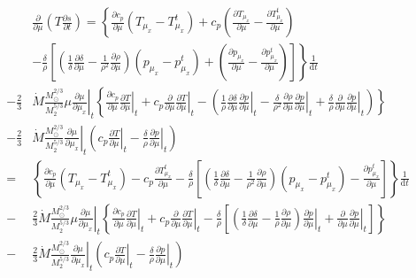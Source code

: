 \documentclass[12pt,a4paper]{article}
\newcommand{\pfird}[2][]{\frac{\partial#1}{\partial#2}}
\newcommand{\dd}[1]{\mathrm{d}#1}
\begin{document}
\begin{itemize}
  \begin{align}
    &\pfird[]{\mu}\left(T\pfird[s]{t}\right) = \left\{\pfird[c_p]{\mu}\left(T_{\mu_x} - T_{\mu_x}^t\right) + c_p\left(\pfird[T_{\mu_x}]{\mu} - \pfird[T_{\mu_x}^t]{\mu}\right)\right.\nonumber\\
    &\left.- \frac{\delta}{\rho}\left[\left(\frac{1}{\delta}\pfird[\delta]{\mu} - \frac{1}{\rho^2}\pfird[\rho]{\mu}\right)\left(p_{\mu_x} - p_{\mu_x}^t\right)  + \left(\pfird[p_{\mu_x}]{\mu} - \pfird[p_{\mu_x}^t]{\mu}\right)\right]\right\}\frac{1}{\dd{t}}\nonumber\\
    -\frac{2}{3}&\dot{M}\frac{M_\odot^{2/3}}{M_2^{5/3}}\mu\left.\pfird[\mu]{\mu_x}\right|_t\left\{\pfird[c_p]{\mu}\left.\pfird[T]{\mu}\right|_t + c_p\pfird[]{\mu}\left.\pfird[T]{\mu}\right|_t - \left(\frac{1}{\rho}\pfird[\delta]{\mu}\left.\pfird[p]{\mu}\right|_t - \frac{\delta}{\rho^2}\pfird[\rho]{\mu}\left.\pfird[p]{\mu}\right|_t + \frac{\delta}{\rho}\pfird[]{\mu}\left.\pfird[p]{\mu}\right|_t\right)\right\}\nonumber\\
    -\frac{2}{3}&\dot{M}\frac{M_\odot^{2/3}}{M_2^{5/3}}\left.\pfird[\mu]{\mu_x}\right|_t\left(c_p\left.\pfird[T]{\mu}\right|_t - \frac{\delta}{\rho}\left.\pfird[p]{\mu}\right|_t\right)\nonumber\\
    =&\left\{\pfird[c_p]{\mu}\left(T_{\mu_x} - T_{\mu_x}^t\right) - c_p\pfird[T_{\mu_x}^t]{\mu} - \frac{\delta}{\rho}\left[\left(\frac{1}{\delta}\pfird[\delta]{\mu} - \frac{1}{\rho^2}\pfird[\rho]{\mu}\right)\left(p_{\mu_x} - p_{\mu_x}^t\right) - \pfird[p_{\mu_x}^t]{\mu}\right]\right\}\frac{1}{\dd{t}}\nonumber\\
    -&\frac{2}{3}\dot{M}\frac{M_\odot^{2/3}}{M_2^{5/3}}\mu\left.\pfird[\mu]{\mu_x}\right|_t\left\{\pfird[c_p]{\mu}\left.\pfird[T]{\mu}\right|_t + c_p\pfird[]{\mu}\left.\pfird[T]{\mu}\right|_t - \frac{\delta}{\rho}\left[\left(\frac{1}{\delta}\pfird[\delta]{\mu} - \frac{1}{\rho}\pfird[\rho]{\mu}\right)\left.\pfird[p]{\mu}\right|_t + \pfird[]{\mu}\left.\pfird[p]{\mu}\right|_t\right]\right\}\nonumber\\
    -&\frac{2}{3}\dot{M}\frac{M_\odot^{2/3}}{M_2^{5/3}}\left.\pfird[\mu]{\mu_x}\right|_t\left(c_p\left.\pfird[T]{\mu}\right|_t - \frac{\delta}{\rho}\left.\pfird[p]{\mu}\right|_t\right)
  \end{align}

\end{itemize}
\end{document}
